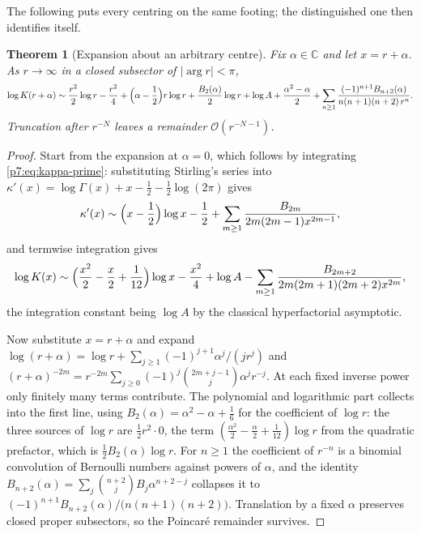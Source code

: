 \documentclass[11pt,a4paper,oneside]{book}
\theoremstyle{plain}
\newtheorem{theorem}{Theorem}[chapter]
\theoremstyle{definition}
\theoremstyle{remark}
\newcommand{\Cplx}{\mathbb{C}}
\newcommand{\bigO}{\mathcal{O}}
\begin{document}
The following puts every centring on the same footing; the distinguished one
then identifies itself.

\begin{theorem}[Expansion about an arbitrary centre]\label{p7:thm:forward}
Fix $\alpha\in\Cplx$ and let $x=r+\alpha$.  As $r\to\infty$ in a closed
subsector of $|\arg r|<\pi$,
\begin{equation}\label{p7:eq:forward-general}
 \log K(r+\alpha)
 \sim\frac{r^{2}}2\log r-\frac{r^{2}}4
 +\Bigl(\alpha-\frac12\Bigr)r\log r
 +\frac{B_2(\alpha)}2\log r
 +\log A+\frac{\alpha^{2}-\alpha}2
 +\sum_{n\ge1}\frac{(-1)^{n+1}B_{n+2}(\alpha)}{n(n+1)(n+2)\,r^{n}} .
\end{equation}
Truncation after $r^{-N}$ leaves a remainder $\bigO(r^{-N-1})$.
\end{theorem}

\begin{proof}
Start from the expansion at $\alpha=0$, which follows by integrating
\eqref{p7:eq:kappa-prime}: substituting Stirling's series into
$\kappa'(x)=\log\Gamma(x)+x-\tfrac12-\tfrac12\log(2\pi)$ gives
\begin{equation}\label{p7:eq:kappa-prime-stirling}
 \kappa'(x)\sim\Bigl(x-\frac12\Bigr)\log x-\frac12
 +\sum_{m\ge1}\frac{B_{2m}}{2m(2m-1)x^{2m-1}},
\end{equation}
and termwise integration gives
\begin{equation}\label{p7:eq:forward-zero}
 \log K(x)\sim\Bigl(\frac{x^{2}}2-\frac x2+\frac1{12}\Bigr)\log x
 -\frac{x^{2}}4+\log A
 -\sum_{m\ge1}\frac{B_{2m+2}}{2m(2m+1)(2m+2)x^{2m}} ,
\end{equation}
the integration constant being $\log A$ by the classical hyperfactorial
asymptotic.

Now substitute $x=r+\alpha$ and expand
$\log(r+\alpha)=\log r+\sum_{j\ge1}(-1)^{j+1}\alpha^{j}/(jr^{j})$ and
$(r+\alpha)^{-2m}=r^{-2m}\sum_{j\ge0}(-1)^{j}\binom{2m+j-1}{j}\alpha^{j}r^{-j}$.
At each fixed inverse power only finitely many terms contribute.  The
polynomial and logarithmic part collects into the first line, using
$B_2(\alpha)=\alpha^{2}-\alpha+\tfrac16$ for the coefficient of $\log r$: the
three sources of $\log r$ are $\tfrac12r^{2}\cdot0$, the term
$(\tfrac{\alpha^{2}}2-\tfrac\alpha2+\tfrac1{12})\log r$ from the quadratic
prefactor, which is $\tfrac12B_2(\alpha)\log r$.  For $n\ge1$ the coefficient
of $r^{-n}$ is a binomial convolution of Bernoulli numbers against powers of
$\alpha$, and the identity
$B_{n+2}(\alpha)=\sum_j\binom{n+2}{j}B_j\alpha^{n+2-j}$ collapses it to
$(-1)^{n+1}B_{n+2}(\alpha)/\bigl(n(n+1)(n+2)\bigr)$.  Translation by a fixed
$\alpha$ preserves closed proper subsectors, so the Poincar\'e remainder
survives.
\end{proof}
\end{document}
